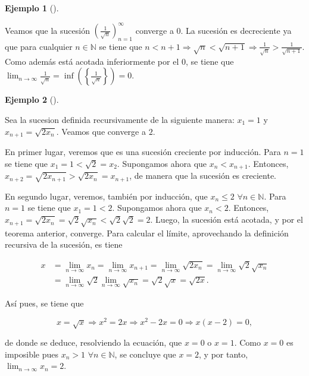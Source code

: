 \documentclass[
  a4paper,
]{scrreport}
\theoremstyle{definition}
\newtheorem{example}{Ejemplo}[chapter]
\theoremstyle{plain}
\theoremstyle{definition}
\theoremstyle{plain}
\theoremstyle{plain}
\theoremstyle{remark}
\begin{document}
\leavevmode{}%
\begin{example}[]\label{exm-sucesiones-monotonas-convergentes-1}

Veamos que la sucesión \(\left(\frac{1}{\sqrt{n}}\right)_{n=1}^\infty\)
converge a 0. La sucesión es decreciente ya que para cualquier
\(n\in\mathbb{N}\) se tiene que
\(n<n+1 \Rightarrow \sqrt{n}< \sqrt{n+1} \Rightarrow \frac{1}{\sqrt{n}}> \frac{1}{\sqrt{n+1}}\).
Como además está acotada inferiormente por el \(0\), se tiene que
\(\lim_{n\to\infty}\frac{1}{\sqrt{n}} = \inf\left(\left\{\frac{1}{\sqrt{n}}\right\}\right)= 0\).

\end{example}

\leavevmode{}%
\begin{example}[]\label{exm-sucesiones-monotonas-convergentes-2}

Sea la sucesion definida recursivamente de la siguiente manera:
\(x_1=1\) y \(x_{n+1}= \sqrt{2x_n}\). Veamos que converge a \(2\).

En primer lugar, veremos que es una sucesión creciente por inducción.
Para \(n=1\) se tiene que \(x_1=1<\sqrt{2}=x_2\). Supongamos ahora que
\(x_n<x_{n+1}\). Entonces,
\(x_{n+2}=\sqrt{2x_{n+1}}>\sqrt{2x_n}=x_{n+1}\), de manera que la
sucesión es creciente.

En segundo lugar, veremos, también por inducción, que \(x_n\leq 2\)
\(\forall n\in\mathbb{N}\). Para \(n=1\) se tiene que \(x_1=1<2\).
Supongamos ahora que \(x_n<2\). Entonces,
\(x_{n+1}=\sqrt{2x_n}=\sqrt{2}\sqrt{x_n}<\sqrt{2}\sqrt{2}=2\). Luego, la
sucesión está acotada, y por el teorema anterior, converge. Para
calcular el límite, aprovechando la definición recursiva de la sucesión,
es tiene

\begin{align*}
x&=\lim_{n\to\infty}x_n = \lim_{n\to\infty} x_{n+1} = \lim_{n\to\infty} \sqrt{2x_n} = \lim_{n\to\infty}\sqrt{2}\sqrt{x_n}\\ 
&= \lim_{n\to\infty}\sqrt{2}\lim_{n\to\infty}\sqrt{x_n}=\sqrt{2}\sqrt{x}=\sqrt{2x}.
\end{align*}

Así pues, se tiene que

\[x=\sqrt{x}\Rightarrow x^2=2x \Rightarrow x^2-2x=0 \Rightarrow x(x-2) = 0,\]

de donde se deduce, resolviendo la ecuación, que \(x=0\) o \(x=1\). Como
\(x=0\) es imposible pues \(x_n>1\) \(\forall n\in\mathbb{N}\), se
concluye que \(x=2\), y por tanto, \(\lim_{n\to\infty}x_n = 2\).

\end{example}
\end{document}

